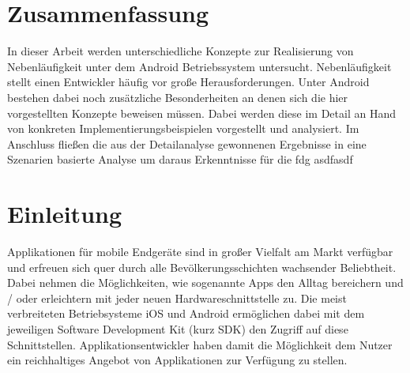 \documentclass[12pt,oneside,a4paper,bibtotoc,liststotoc]{scrreprt}
\begin{document}
\onehalfspacing %

\chapter*{Zusammenfassung}
In dieser Arbeit werden unterschiedliche Konzepte zur Realisierung von Nebenläufigkeit unter dem Android Betriebssystem untersucht. Nebenläufigkeit stellt einen Entwickler häufig vor große Herausforderungen. Unter Android bestehen dabei noch zusätzliche Besonderheiten an denen sich die hier vorgestellten Konzepte beweisen müssen. Dabei werden diese im Detail an Hand von konkreten Implementierungsbeispielen vorgestellt und analysiert. Im Anschluss fließen die aus der Detailanalyse gewonnenen Ergebnisse in eine Szenarien basierte Analyse um daraus Erkenntnisse für die 
fdg \newline
asdfasdf

\tableofcontents
\listoffigures


\chapter{Einleitung}
Applikationen für mobile Endgeräte sind in großer Vielfalt am Markt verfügbar und erfreuen sich quer durch alle Bevölkerungsschichten wachsender Beliebtheit. Dabei nehmen die Möglichkeiten, wie sogenannte Apps den Alltag bereichern und / oder erleichtern mit jeder neuen Hardwareschnittstelle zu. Die meist verbreiteten Betriebsysteme iOS und Android ermöglichen dabei mit dem jeweiligen Software Development Kit (kurz SDK) den Zugriff auf diese Schnittstellen. Applikationsentwickler haben damit die Möglichkeit dem Nutzer ein reichhaltiges Angebot von Applikationen zur Verfügung zu stellen.
\end{document}
